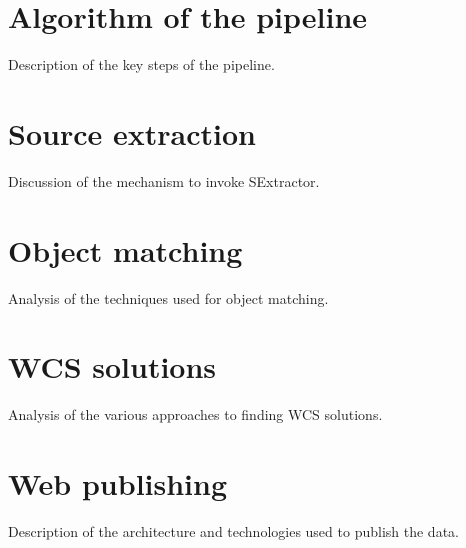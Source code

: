 \section{Algorithm of the pipeline} 

Description of the key steps of the pipeline. 

\section{Source extraction}

Discussion of the mechanism to invoke SExtractor.

\section{Object matching}

Analysis of the techniques used for object matching.

\section{WCS solutions}

Analysis of the various approaches to finding WCS solutions.

\section{Web publishing}

Description of the architecture and technologies used to publish the data. 
